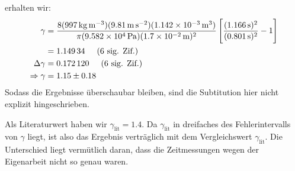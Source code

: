 erhalten wir:
\begin{align*}
	\gamma &= \frac{8(\SI{997}{\kilo\gram\per\meter\cubed}) (\SI{9.81}{\meter\per\second\squared}) (\SI{1.142e-3}{\meter\cubed})}{\pi (\SI{9.582e4}{\pascal}) (\SI{1.7e-2}{\meter})^2} \left[\frac{(\SI{1,166}{\second})^2}{(\SI{0.801}{\second})^2} - 1\right] \\
	&= \num{1.14934} \sigfig{6} \\
	\Delta \gamma &= \num{0.172120} \sigfig{6} \\
	\Rightarrow \gamma &= \num{1.15(18)}
\end{align*}
Sodass die Ergebnisse überschaubar bleiben, sind die Subtitution hier nicht explizit hingeschrieben.

Als Literaturwert haben wir $\gamma_\text{lit} = 1.4$. Da $\gamma_\text{lit}$ in dreifaches des Fehlerintervalls von $\gamma$ liegt, ist also das Ergebnis verträglich mit dem Vergleichswert $\gamma_\text{lit}$. Die Unterschied liegt vermütlich daran, dass die Zeitmessungen wegen der Eigenarbeit nicht so genau waren.

